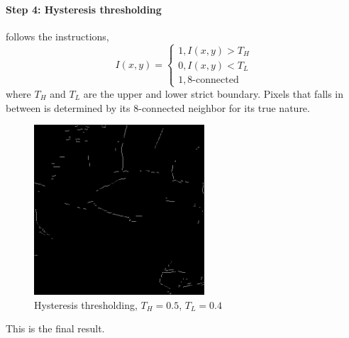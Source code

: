 \documentclass[12pt]{article}
\begin{document}
\paragraph*{Step 4: Hysteresis thresholding} 
follows the instructions, 
\begin{equation}
I(x, y) = 
\begin{cases}
1, I(x, y) > T_H \\
0, I(x, y) < T_L \\
1, \text{8-connected}
\end{cases}
\end{equation}
where $T_H$ and $T_L$ are the upper and lower strict boundary. Pixels that falls in between is determined by its 8-connected neighbor for its true nature.
\begin{figure}[H]
    \centering
    \includegraphics[height=2.5in]{images/canny_4}
    \caption{Hysteresis thresholding, $T_H = 0.5$, $T_L = 0.4$}
\end{figure}
This is the final result.
\end{document}
